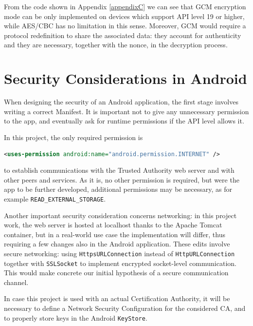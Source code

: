 From the code shown in Appendix \ref{appendixC} we can see that GCM encryption mode can be only implemented on devices which support API level 19 or higher, while AES/CBC has no limitation in this sense. Moreover, GCM would require a protocol redefinition to share the associated data: they account for authenticity and they are necessary, together with the nonce, in the decryption process.

\section{Security Considerations in Android}
When designing the security of an Android application, the first stage involves writing a correct Manifest. It is important not to give any unnecessary permission to the app, and eventually ask for runtime permissions if the API level allows it.

In this project, the only required permission is

\lstinline[language=XML]!<uses-permission android:name="android.permission.INTERNET" />!

\noindent to establish communications with the Trusted Authority web server and with other peers and services. As it is, no other permission is required, but were the app to be further developed, additional permissions may be necessary, as for example \texttt{READ\_EXTERNAL\_STORAGE}.

Another important security consideration concerns networking: in this project work, the web server is hosted at localhost thanks to the Apache Tomcat container, but in a real-world use case the implementation will differ, thus requiring a few changes also in the Android application. These edits involve secure networking: using \texttt{HttpsURLConnection} instead of \texttt{HttpURLConnection} together with \texttt{SSLSocket} to implement encrypted socket-level communication. This would make concrete our initial hypothesis of a secure communication channel.

In case this project is used with an actual Certification Authority, it will be necessary to define a Network Security Configuration for the considered CA, and to properly store keys in the Android \texttt{KeyStore}.